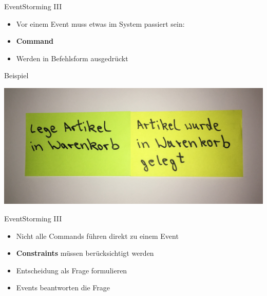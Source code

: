 \begin{frame}[fragile]{EventStorming III}

\begin{itemize}
\item Vor einem Event muss etwas im System passiert sein:
\item \textbf{Command}
\item Werden in Befehlsform ausgedrückt
\end{itemize}

\end{frame}

\begin{frame}[fragile]{Beispiel}

\begin{center}
\includegraphics[width=.7\textwidth]{pics/eventstorming2.jpg}
\end{center}

\end{frame}


\begin{frame}[fragile]{EventStorming III}

\begin{itemize}
\item Nicht alle Commands führen direkt zu einem Event
\item \textbf{Constraints} müssen berücksichtigt werden
\item Entscheidung als Frage formulieren
\item Events beantworten die Frage
\end{itemize}

\end{frame}

